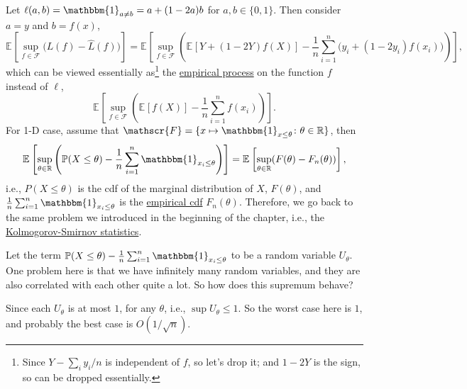 \begin{eg}\label{eg:1D-classification-thresholds}
	Let \(\ell (a, b) = \mathbbm{1}_{a \neq b} = a + (1 - 2a)b\) for \(a, b\in \{ 0, 1 \} \). Then consider \(a = y\) and \(b = f(x)\),
	\[
		\mathbb{E}_{}\left[\sup _{f\in \mathscr{F} } \big( L(f) - \hat{L} (f) \big) \right]
		= \mathbb{E}_{}\left[\sup _{f\in \mathscr{F} } \left( \mathbb{E}_{}\left[Y + (1 - 2Y)f(X) \right] - \frac{1}{n} \sum_{i=1}^{n} \big( y_i + (1 - 2y_i)f(x_i) \big) \right)  \right],
	\]
	which can be viewed essentially as\footnote{Since \(Y - \sum_{i} y_i / n\) is independent of \(f\), so let's drop it; and \(1 - 2Y\) is the sign, so can be dropped essentially.} the \hyperref[def:EP]{empirical process} on the function \(f\) instead of \(\ell \),
	\[
		\mathbb{E}_{}\left[\sup _{f\in \mathscr{F} } \left( \mathbb{E}_{}\left[f(X) \right] - \frac{1}{n}\sum_{i=1}^{n} f(x_i) \right)  \right].
	\]
	For 1-D case, assume that \(\mathscr{F} = \{ x \mapsto \mathbbm{1}_{x \leq \theta } \colon \theta \in \mathbb{R}  \}\), then
	\[
		\mathbb{E}_{}\left[\sup _{\theta \in \mathbb{R} } \left( \mathbb{P} (X \leq \theta ) - \frac{1}{n} \sum_{i=1}^{n} \mathbbm{1}_{x_i \leq \theta } \right) \right]
		= \mathbb{E}_{}\left[\sup _{\theta \in \mathbb{R} } (F(\theta ) - F_n(\theta )) \right] ,
	\]
	i.e., \(P(X \leq \theta )\) is the cdf of the marginal distribution of \(X\), \(F(\theta )\), and \(\frac{1}{n}\sum_{i=1}^{n} \mathbbm{1}_{x_i \leq \theta } \) is the \hyperref[def:empirical-cdf]{empirical cdf} \(F_n(\theta )\). Therefore, we go back to the same problem we introduced in the beginning of the chapter, i.e., the \hyperref[def:Kolmogorov-Smirnov-statistics]{Kolmogorov-Smirnov statistics}.

	Let the term \(\mathbb{P} (X \leq \theta ) - \frac{1}{n}\sum_{i=1}^{n} \mathbbm{1}_{x_i \leq \theta } \) to be a random variable \(U_\theta \). One problem here is that we have infinitely many random variables, and they are also correlated with each other quite a lot. So how does this supremum behave?

	Since each \(U_\theta \) is at most \(1\), for any \(\theta \), i.e., \(\sup U_\theta \leq 1\). So the worst case here is \(1\), and probably the best case is \(O(1 / \sqrt{n} )\).
\end{eg}